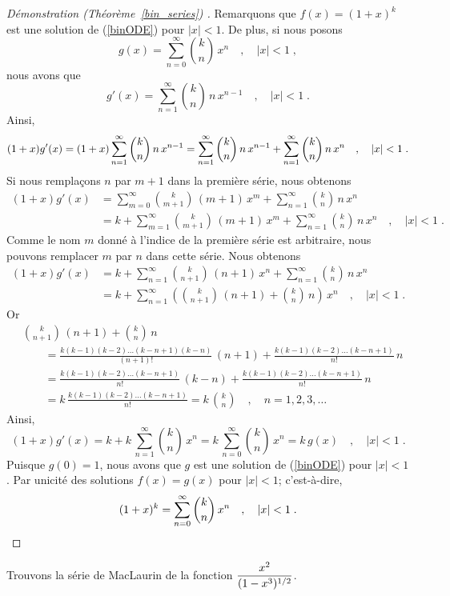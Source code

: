 {\begin{proof}[Démonstration (Théorème~\ref{bin_series}) \theory]
Remarquons que $f(x) = (1+x)^k$ est une solution de (\ref{binODE})
pour $|x|<1$.  De plus, si nous posons
\[
g(x) = \sum_{n=0}^\infty \binom{k}{n} \, x^n \quad , \quad |x|<1 \; ,
\]
nous avons que
\[
g'(x) = \sum_{n=1}^\infty \binom{k}{n}\,n \, x^{n-1}
\quad , \quad |x|<1 \; .
\]
Ainsi,
\[
(1+x) g'(x) = (1+x) \sum_{n=1}^\infty \binom{k}{n}\,n \, x^{n-1} \\
= \sum_{n=1}^\infty \binom{k}{n}\,n \, x^{n-1} +
\sum_{n=1}^\infty \binom{k}{n}\,n \, x^n \quad , \quad |x|<1 \; .
\]
Si nous remplaçons $n$ par $m+1$ dans la première série, nous obtenons
\begin{align*}
(1+x) g'(x)
&= \sum_{m=0}^\infty \binom{k}{m+1}\,(m+1) \, x^m +
\sum_{n=1}^\infty \binom{k}{n}\,n \, x^n \\
&= k + \sum_{m=1}^\infty \binom{k}{m+1}\,(m+1) \, x^m +
\sum_{n=1}^\infty \binom{k}{n}\,n \, x^n \quad , \quad |x|<1 \; .
\end{align*}
Comme le nom $m$ donné à l'indice de la première série est arbitraire, nous
pouvons remplacer $m$ par $n$ dans cette série.  Nous obtenons
\begin{align*}
(1+x) g'(x)
&= k + \sum_{n=1}^\infty \binom{k}{n+1}\,(n+1) \, x^n +
\sum_{n=1}^\infty \binom{k}{n}\,n \, x^n \\
&= k + \sum_{n=1}^\infty \left( \binom{k}{n+1}\,(n+1)
+ \binom{k}{n}\,n \right) \, x^n \quad , \quad |x|<1 \; .
\end{align*}
Or
\begin{align*}
& \binom{k}{n+1}\,(n+1) + \binom{k}{n}\,n \\
& \qquad = \frac{k(k-1)(k-2)\ldots(k-n+1)(k-n)}{(n+1)!} \, (n+1)
+ \frac{k(k-1)(k-2)\ldots(k-n+1)}{n!} \, n \\
& \qquad = \frac{k(k-1)(k-2)\ldots(k-n+1)}{n!} \, (k-n) +
\frac{k(k-1)(k-2)\ldots(k-n+1)}{n!} \, n \\
& \qquad = k\,\frac{k(k-1)(k-2)\ldots(k-n+1)}{n!} = k\, \binom{k}{n}
\quad , \quad n=1,2,3,\ldots
\end{align*}
Ainsi,
\[
(1+x) g'(x)
= k + k \,\sum_{n=1}^\infty \binom{k}{n} \, x^n
= k\, \sum_{n=0}^\infty \binom{k}{n} \, x^n
= k\, g(x) \quad , \quad |x|<1 \; .
\]
Puisque $g(0) =1$, nous avons que $g$ est une solution de (\ref{binODE}) pour
$|x|<1$.  Par unicité des solutions $f(x)=g(x)$ pour $|x|<1$; c'est-à-dire,
\[
(1+x)^k = \sum_{n=0}^\infty \binom{k}{n} \, x^n \quad , \quad |x|<1 
\; .   \qedhere
\]
\end{proof}

\begin{egg}
Trouvons la série de MacLaurin de la fonction
$\displaystyle \frac{x^2}{(1-x^3)^{1/2}}$.


\end{egg}}
